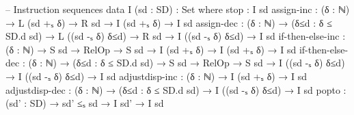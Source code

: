 \documentclass{article}
\begin{document}
\begin{prev}
\begin{code}
-- Instruction sequences
data I (sd : SD) : Set where
    stop : I sd
    assign-inc : (δ : ℕ) → L (sd +ₛ δ) → R sd → I (sd +ₛ δ) → I sd
    assign-dec : (δ : ℕ) → (δ≤d : δ ≤ SD.d sd) → L ((sd -ₛ δ) δ≤d) → R sd → I ((sd -ₛ δ) δ≤d)  → I sd
    if-then-else-inc : (δ : ℕ) → S sd → RelOp → S sd → I (sd +ₛ δ) → I (sd +ₛ δ) → I sd
    if-then-else-dec : (δ : ℕ) → (δ≤d : δ ≤ SD.d sd) → S sd → RelOp → S sd → I ((sd -ₛ δ) δ≤d) → I ((sd -ₛ δ) δ≤d) → I sd
    adjustdisp-inc : (δ : ℕ) → I (sd +ₛ δ) → I sd
    adjustdisp-dec : (δ : ℕ) → (δ≤d : δ ≤ SD.d sd) → I ((sd -ₛ δ) δ≤d) → I sd
    popto : (sd' : SD) → sd' ≤ₛ sd → I sd' → I sd 
\end{code}
\end{prev}
\end{document}

